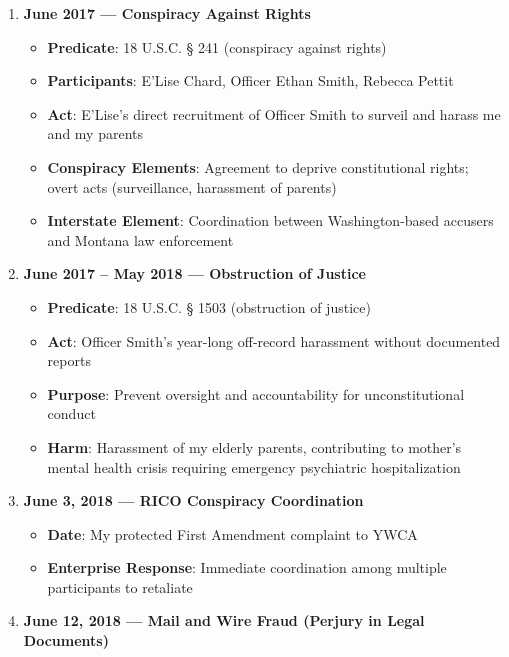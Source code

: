 \documentclass[12pt,letterpaper]{article}
\begin{document}
\begin{enumerate}
\item \textbf{June 2017 --- Conspiracy Against Rights}

\begin{itemize}
\item \textbf{Predicate}: 18 U.S.C. § 241 (conspiracy against rights)
\item \textbf{Participants}: E'Lise Chard, Officer Ethan Smith, Rebecca Pettit
\item \textbf{Act}: E'Lise's direct recruitment of Officer Smith to surveil and harass me and my parents
\item \textbf{Conspiracy Elements}: Agreement to deprive constitutional rights; overt acts (surveillance, harassment of parents)
\item \textbf{Interstate Element}: Coordination between Washington-based accusers and Montana law enforcement
\end{itemize}

\item \textbf{June 2017 -- May 2018 --- Obstruction of Justice}

\begin{itemize}
\item \textbf{Predicate}: 18 U.S.C. § 1503 (obstruction of justice)
\item \textbf{Act}: Officer Smith's year-long off-record harassment without documented reports
\item \textbf{Purpose}: Prevent oversight and accountability for unconstitutional conduct
\item \textbf{Harm}: Harassment of my elderly parents, contributing to mother's mental health crisis requiring emergency psychiatric hospitalization
\end{itemize}

\item \textbf{June 3, 2018 --- RICO Conspiracy Coordination}

\begin{itemize}
\item \textbf{Date}: My protected First Amendment complaint to YWCA
\item \textbf{Enterprise Response}: Immediate coordination among multiple participants to retaliate
\end{itemize}

\item \textbf{June 12, 2018 --- Mail and Wire Fraud (Perjury in Legal Documents)}


\end{enumerate}
\end{document}
